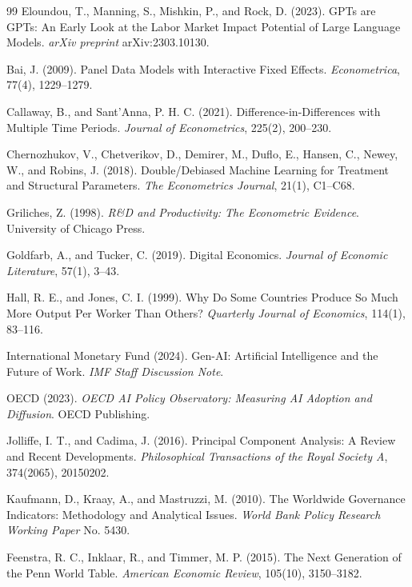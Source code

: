 \begin{thebibliography}{99}
Eloundou, T., Manning, S., Mishkin, P., and Rock, D. (2023).
GPTs are GPTs: An Early Look at the Labor Market Impact Potential of Large Language Models.
\textit{arXiv preprint} arXiv:2303.10130.

Bai, J. (2009).
Panel Data Models with Interactive Fixed Effects.
\textit{Econometrica}, 77(4), 1229--1279.

Callaway, B., and Sant'Anna, P. H. C. (2021).
Difference-in-Differences with Multiple Time Periods.
\textit{Journal of Econometrics}, 225(2), 200--230.

Chernozhukov, V., Chetverikov, D., Demirer, M., Duflo, E., Hansen, C., Newey, W., and Robins, J. (2018).
Double/Debiased Machine Learning for Treatment and Structural Parameters.
\textit{The Econometrics Journal}, 21(1), C1--C68.

Griliches, Z. (1998).
\textit{R\&D and Productivity: The Econometric Evidence}.
University of Chicago Press.

Goldfarb, A., and Tucker, C. (2019).
Digital Economics.
\textit{Journal of Economic Literature}, 57(1), 3--43.

Hall, R. E., and Jones, C. I. (1999).
Why Do Some Countries Produce So Much More Output Per Worker Than Others?
\textit{Quarterly Journal of Economics}, 114(1), 83--116.

International Monetary Fund (2024).
Gen-AI: Artificial Intelligence and the Future of Work.
\textit{IMF Staff Discussion Note}.

OECD (2023).
\textit{OECD AI Policy Observatory: Measuring AI Adoption and Diffusion}.
OECD Publishing.

Jolliffe, I. T., and Cadima, J. (2016).
Principal Component Analysis: A Review and Recent Developments.
\textit{Philosophical Transactions of the Royal Society A}, 374(2065), 20150202.

Kaufmann, D., Kraay, A., and Mastruzzi, M. (2010).
The Worldwide Governance Indicators: Methodology and Analytical Issues.
\textit{World Bank Policy Research Working Paper} No. 5430.

Feenstra, R. C., Inklaar, R., and Timmer, M. P. (2015).
The Next Generation of the Penn World Table.
\textit{American Economic Review}, 105(10), 3150--3182.


\end{thebibliography}
